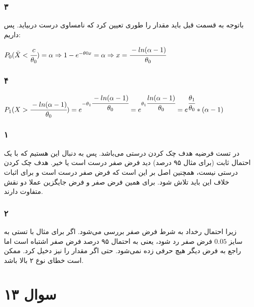\documentclass[12pt]{article}
\begin{document}
	
	\subsubsection{۳}
باتوجه به قسمت قبل باید مقدار 
را طوری تعیین کرد که نامساوی درست دربیاید. پس داریم:
\begin{latin}
$
P_0(\bar{X} < \cfrac{c}{\theta_0}) = \alpha \Rightarrow 1 - e^{-\theta0 x } = \alpha \Rightarrow x = \cfrac{-ln (\alpha - 1)}{\theta_0}
$
\end{latin}
\subsubsection{۴}
\begin{latin}

$
P_1 (X > \cfrac{-ln (\alpha - 1)}{\theta_0})  = e^{-\theta_1 \cfrac{-ln (\alpha - 1)}{\theta_0}} 
= e^{\theta_1 \cfrac{ln (\alpha - 1)}{\theta_0}}  
= e^{\cfrac{\theta_1}{\theta_0}} * (\alpha - 1)
$
\end{latin}
	\subsubsection{۱}
	در تست فرضیه هدف چک کردن درستی 
	می‌باشد. پس به دنبال این هستیم که با یک احتمال ثابت (برای مثال ۹۵ درصد) دید فرض صفر درست است یا خیر. هدف چک کردن درستی 
	نیست، همچنین اصل بر این است که فرض صفر درست است و برای اثبات خلاف این باید تلاش شود. برای همین فرض صفر و فرض جایگزین عملا دو نقش متفاوت دارند.
\subsubsection{۲}
زیرا احتمال رخداد به شرط فرض صفر بررسی می‌شود. اگر برای مثال با تستی به سایز 
$0.05$
فرض صفر رد شود، یعنی به احتمال ۹۵ درصد فرض صفر اشتباه است اما راجع به فرض دیگر هیچ حرفی زده نمی‌شود. حتی اگر مقدار  را نیز دخیل کرد. ممکن است خطای نوع ۲ بالا باشد.
	
	\section{سوال ۱۳}
\end{document}

